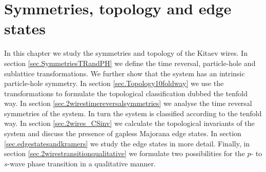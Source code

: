 
\chapter{Symmetries, topology and edge states } %

\label{Chapter5} %

In this chapter we study the symmetries and topology of the Kitaev wires. In section \ref{sec.SymmetriesTRandPH} we define the time reversal, particle-hole and sublattice transformations. We further show that the system has an intrinsic particle-hole symmetry. In section \ref{sec.Topology10foldway} we use the transformations to formulate the topological classification dubbed the tenfold way. In section \ref{sec.2wirestimereversalsymmetries} we analyse the time reversal symmetries of the system. In turn the system is classified according to the tenfold way. In section \ref{sec.2wires_CSinv} we calculate the topological invariants of the system and discuss the presence of gapless Majorana edge states. In section \ref{sec.edgestatesandkramers} we study the edge states in more detail. Finally, in section \ref{sec.2wirestransitionqualitative} we formulate two possibilities for the $p$- to $s$-wave phase transition in a qualitative manner. 

